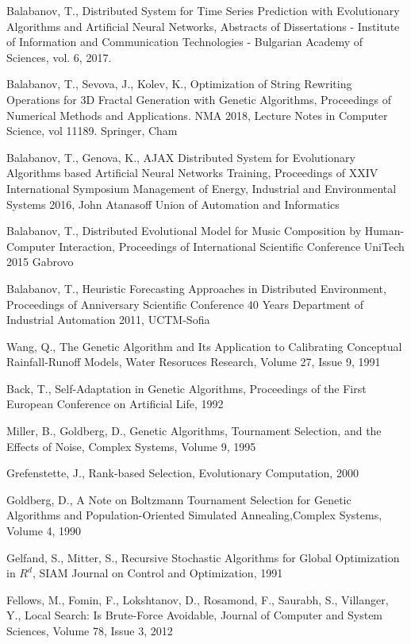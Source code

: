 \biblstarthook{}

\begin{thebibliography}{99.}
Balabanov, T., Distributed System for Time Series Prediction with Evolutionary Algorithms and Artificial Neural Networks, Abstracts of Dissertations - Institute of Information and Communication Technologies - Bulgarian Academy of Sciences, vol. 6, 2017.

Balabanov, T., Sevova, J., Kolev, K., Optimization of String Rewriting Operations for 3D Fractal Generation with Genetic Algorithms, Proceedings of Numerical Methods and Applications. NMA 2018, Lecture Notes in Computer Science, vol 11189. Springer, Cham

Balabanov, T., Genova, K., AJAX Distributed System for Evolutionary Algorithms based Artificial Neural Networks Training, Proceedings of XXIV International Symposium Management of Energy, Industrial and Environmental Systems 2016, John Atanasoff Union of Automation and Informatics

Balabanov, T., Distributed Evolutional Model for Music Composition by Human-Computer Interaction, Proceedings of International Scientific Conference UniTech 2015 Gabrovo

Balabanov, T., Heuristic Forecasting Approaches in Distributed Environment, Proceedings of Anniversary Scientific Conference 40 Years Department of Industrial Automation 2011, UCTM-Sofia

Wang, Q., The Genetic Algorithm and Its Application to Calibrating Conceptual Rainfall‐Runoff Models, Water Resoruces Research, Volume 27, Issue 9, 1991

Back, T., Self-Adaptation in Genetic Algorithms, Proceedings of the First European Conference on Artificial Life, 1992

Miller, B., Goldberg, D., Genetic Algorithms, Tournament Selection, and the Effects of Noise, Complex Systems, Volume 9, 1995

Grefenstette, J., Rank-based Selection, Evolutionary Computation, 2000

Goldberg, D., A Note on Boltzmann Tournament Selection for Genetic Algorithms and Population-Oriented Simulated Annealing,Complex Systems, Volume 4, 1990

Gelfand, S., Mitter, S., Recursive Stochastic Algorithms for Global Optimization in $R^d$, SIAM Journal on Control and Optimization, 1991

Fellows, M., Fomin, F., Lokshtanov, D., Rosamond, F., Saurabh, S., Villanger, Y., Local Search: Is Brute-Force Avoidable, Journal of Computer and System Sciences, Volume 78, Issue 3, 2012


\end{thebibliography}
